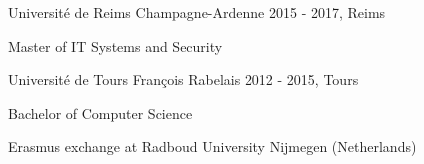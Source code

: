 


\begin{cventries}



\cventry
{} %
{Université de Reims Champagne-Ardenne} %
{2015 - 2017, Reims} %
{} %
{ %
\begin{cvitems}
\item {Master of IT Systems and Security}
\end{cvitems}
}





\cventry
{} %
{Université de Tours François Rabelais} %
{2012 - 2015, Tours} %
{} %
{ %
\begin{cvitems}
\item {Bachelor of Computer Science}
\item {Erasmus exchange at Radboud University Nijmegen (Netherlands)}
\end{cvitems}
}




\end{cventries}